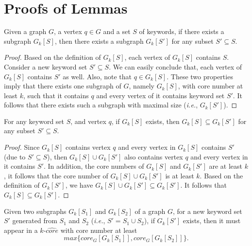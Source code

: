 \section{Proofs of Lemmas}
\label{app:proof}

\addtocounter{lemma}{-1}
\addtocounter{lemma}{-1}
\addtocounter{lemma}{-1}
\addtocounter{lemma}{-1}
\addtocounter{equation}{-1}
\addtocounter{equation}{-1}

\begin{lemma}
  \label{lemma:apriori-app}
  Given a graph $G$, a vertex $q\in G$ and a set $S$ of keywords, if there exists a subgraph $G_k[S]$,
  then there exists a subgraph $G_k[S']$ for any subset $S'\subseteq S$.
\end{lemma}

\begin{proof}
Based on the definition of $G_k[S]$, each vertex of $G_k[S]$ contains $S$.
Consider a new keyword set $S'\subseteq S$.
We can easily conclude that,
each vertex of $G_k[S]$ contains $S'$ as well.
Also, note that $q\in G_k[S]$.
These two properties imply that there exists one subgraph of $G$,
namely $G_k[S]$, with core number at least $k$,
such that it contains $q$ and every vertex of it contains keyword set $S'$.
It follows that there exists such a subgraph with maximal size (\textit{i.e.}, $G_k[S']$).
\end{proof}

\begin{proposition}\label{prop:pre-app}
  For any keyword set $S$, and vertex $q$,
  if $G_k[S]$ exists, then $G_k[S]\subseteq G_k[S']$ for any subset $S'\subseteq S$.
\end{proposition}

\begin{proof}
Since $G_k[S]$ contains vertex $q$ and every vertex in $G_k[S]$ contains $S'$ (due to $S'\subseteq S$), then $G_k[S]\cup G_k[S']$ also contains vertex $q$ and every vertex in it contains $S'$. In addition, the core numbers of $G_k[S]$ and $G_k[S']$ are at least $k$, it follows that the core number of $G_k[S]\cup G_k[S']$ is at least $k$.
Based on the definition of $G_k[S']$, we have $G_k[S]\cup G_k[S']\subseteq G_k[S']$. It follows that $G_k[S]\subseteq G_k[S']$.
\end{proof}


\begin{lemma}
\label{lemma:coreDown-app}
  Given two subgraphs $G_k[S_1]$ and $G_k[S_2]$ of a graph $G$,
  for a new keyword set $S'$ generated from $S_1$ and $S_2$ (\textit{i.e.}, $S'=S_1\cup S_2$),
  if $G_k[S']$ exists, then it must appear in a $k$-$\widehat {core}$ with core number at least
  \begin{equation}
    max\{core_G[G_k[S_1]], core_G[G_k[S_2]]\}.
  \end{equation}
\end{lemma}

